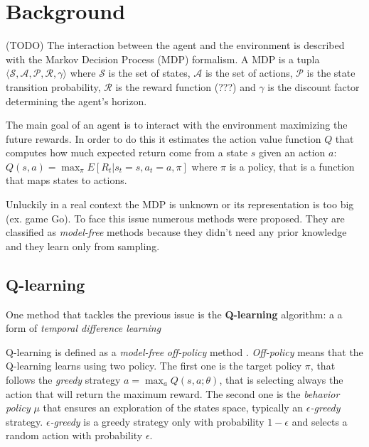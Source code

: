 \section{Background}

(TODO)
The interaction between the agent and the environment is described  with the
Markov Decision Process (MDP) formalism. A MDP is a tupla $\langle \mathcal{S}, 
\mathcal{A}, \mathcal{P}, \mathcal{R}, \gamma \rangle$ where $\mathcal{S}$ is
the set of states, $\mathcal{A}$ is the set of actions, $\mathcal{P}$ is the 
state transition probability, $\mathcal{R}$ is the reward function (???) and 
$\gamma$ is the discount factor determining the agent's horizon.

The main goal of an agent is to interact with the environment maximizing the future rewards. In order to do this it estimates the action value function $Q$ that computes how much expected return come from a state $s$ given an action $a$: $Q(s, a) = \max_\pi E[R_t | s_t = s, a_t = a, \pi]$ where $\pi$ is a policy, that is a function that maps states to actions.


Unluckily in a real context the MDP is unknown or its representation is too big
(ex. game Go). To face this issue numerous methods were proposed. They are 
classified as \textit{model-free} methods because they didn't need any prior knowledge and they learn only from sampling.

\subsection{Q-learning}

One method that tackles the previous issue is the \textbf{Q-learning} algorithm: a a form of \textit{temporal difference learning} \cite{Sutton:1998:IRL:551283}

Q-learning is defined as a \textit{model-free} \textit{off-policy} method \cite{Watkins1992}. \textit{Off-policy} means that the Q-learning learns using two policy. The first one is the target policy $\pi$, that follows the \textit{greedy} strategy $a = \max_a Q(s, a; \theta)$, that is selecting always the action that will return the maximum reward.
The second one is the \textit{behavior policy} $\mu$ that ensures an exploration of the states space, typically an \textit{$\epsilon$-greedy} strategy. \textit{$\epsilon$-greedy} is a greedy strategy only with probability $1 - \epsilon$ and selects a random action with probability $\epsilon$.

